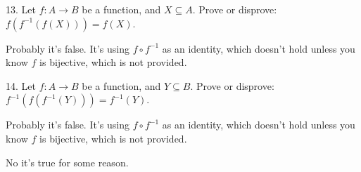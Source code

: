 \documentclass{hippoidC}
\begin{document}
\begin{prooflist}{13. Let $f: A \rightarrow B$ be a function, and $X \subseteq
    A$. Prove or disprove: $f\left(f^{-1}(f(X))\right)=f(X)$.}
\item Probably it's false. It's using $f\circ f^{-1}$ as an identity, which
    doesn't hold unless you know $f$ is bijective, which is not provided.
\end{prooflist}

\begin{prooflist}{14. Let $f: A \rightarrow B$ be a function, and $Y \subseteq
    B$. Prove or disprove:
$f^{-1}\left(f\left(f^{-1}(Y)\right)\right)=f^{-1}(Y)$.}
\item Probably it's false. It's using $f\circ f^{-1}$ as an identity, which
    doesn't hold unless you know $f$ is bijective, which is not provided.
\item No it's true for some reason.
\end{prooflist}
\end{document}
